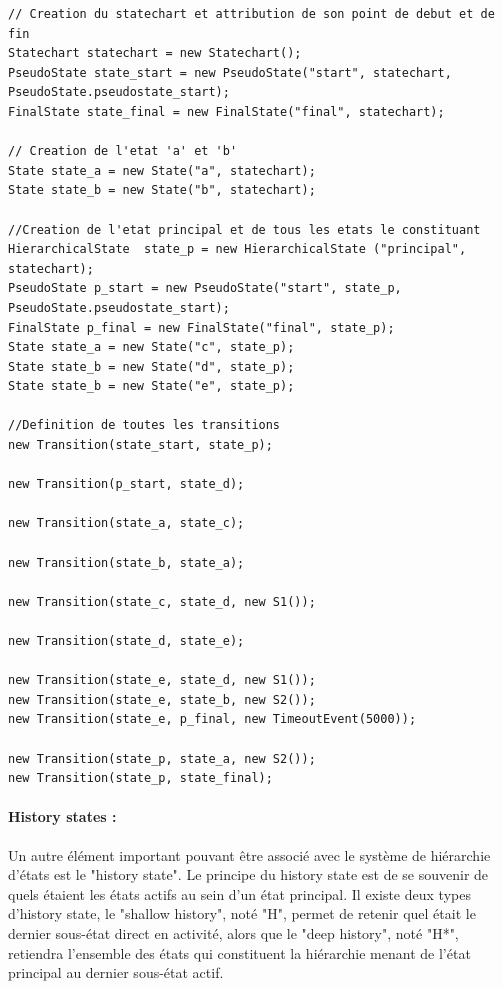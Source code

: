 \documentclass[french, 12pt, a4paper]{article}
\begin{document}
        \begin{lstlisting}[basicstyle=\small]
// Creation du statechart et attribution de son point de debut et de fin
Statechart statechart = new Statechart();
PseudoState state_start = new PseudoState("start", statechart, PseudoState.pseudostate_start);
FinalState state_final = new FinalState("final", statechart);

// Creation de l'etat 'a' et 'b'
State state_a = new State("a", statechart);
State state_b = new State("b", statechart);

//Creation de l'etat principal et de tous les etats le constituant
HierarchicalState  state_p = new HierarchicalState ("principal", statechart);
PseudoState p_start = new PseudoState("start", state_p, PseudoState.pseudostate_start);
FinalState p_final = new FinalState("final", state_p);
State state_a = new State("c", state_p);
State state_b = new State("d", state_p);
State state_b = new State("e", state_p);

//Definition de toutes les transitions
new Transition(state_start, state_p);

new Transition(p_start, state_d);

new Transition(state_a, state_c);

new Transition(state_b, state_a);

new Transition(state_c, state_d, new S1());

new Transition(state_d, state_e);

new Transition(state_e, state_d, new S1());
new Transition(state_e, state_b, new S2());
new Transition(state_e, p_final, new TimeoutEvent(5000));

new Transition(state_p, state_a, new S2());
new Transition(state_p, state_final);

        \end{lstlisting}
        
        \paragraph{History states : }
        Un autre élément important pouvant être associé avec le système de hiérarchie d'états est le "history state". Le principe du history state est de se souvenir de quels étaient les états actifs au sein d'un état principal. Il existe deux types d'history state, le "shallow history", noté "H", permet de retenir quel était le dernier sous-état direct en activité, alors que le "deep history", noté "H*", retiendra l'ensemble des états qui constituent la hiérarchie menant de l'état principal au dernier sous-état actif.
\end{document}
